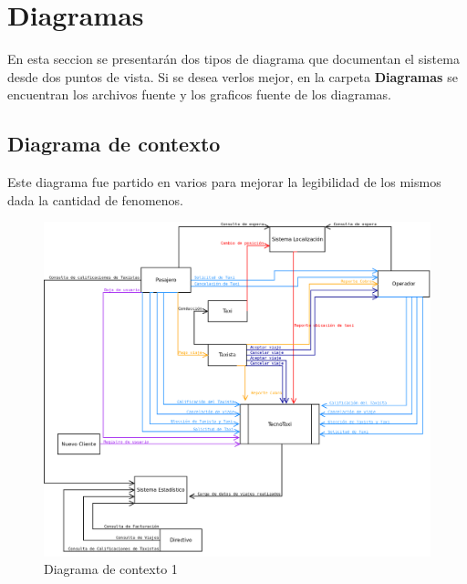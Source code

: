 \section{Diagramas}
En esta seccion se presentar\'an dos tipos de diagrama que documentan el sistema desde dos puntos de vista. Si se desea verlos mejor, en la carpeta \textbf{Diagramas} se encuentran los archivos fuente y los graficos fuente de los diagramas.

\subsection{Diagrama de contexto}
Este diagrama fue partido en varios para mejorar la legibilidad de los mismos dada la cantidad de fenomenos.

\begin{figure}[h!]
  \centering    
    \includegraphics[scale=0.40]{diagramas/contexto/contextoAmpliado.png}
  \caption{Diagrama de contexto 1}
\end{figure}

